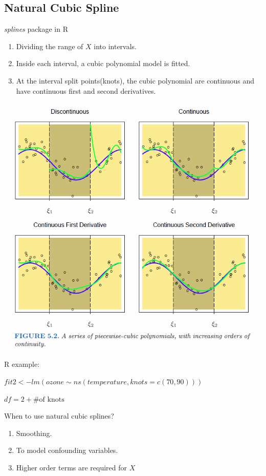 \documentclass[10pt,landscape, fleqn]{article}
\begin{document}
\begin{multicols}{3}
		\section{Natural Cubic Spline}
			\textit{splines} package in R
			\begin{enumerate}
				\item Dividing the range of $X$ into intervals.
				\item Inside each interval, a cubic polynomial model is fitted.
				\item At the interval split points(knots), the cubic polynomial are continuous and have continuous first and second derivatives.
			\end{enumerate}
			\begin{center}
				\includegraphics[width=0.95\linewidth]{Image}
			\end{center}
			R example: \par 
			$fit2<-lm(ozone\sim ns(temperature,knots=c(70,90)))$ \par
			$df = 2 + \mbox{\# of knots}$ \par 
			When to use natural cubic splines?
			\begin{enumerate}
				\item Smoothing.
				\item To model confounding variables.
				\item Higher order terms are required for $X$
			\end{enumerate}
		

\end{multicols}
\end{document}
